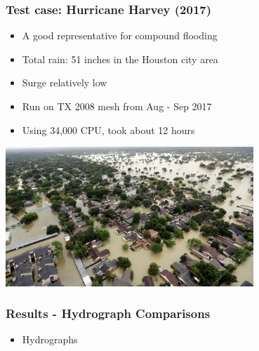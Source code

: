 \documentclass[10pt]{oden_beamer}
\begin{document}
\begin{frame}
  \frametitle{Test case: Hurricane Harvey (2017)}
  \begin{itemize}
  \item A good representative for compound flooding
  \item Total rain: 51 inches in the Houston city area
  \item Surge relatively low
  \item Run on TX 2008 mesh from Aug - Sep 2017
  \item Using 34,000 CPU, took about 12 hours
  \end{itemize}
  \includegraphics[width=0.7\textwidth]{harvey.jpg}
\end{frame}
\begin{frame}
  \frametitle{Results - Hydrograph Comparisons}
  \begin{itemize}
  \item Hydrographs
  \end{itemize}
\end{frame}
\end{document}

